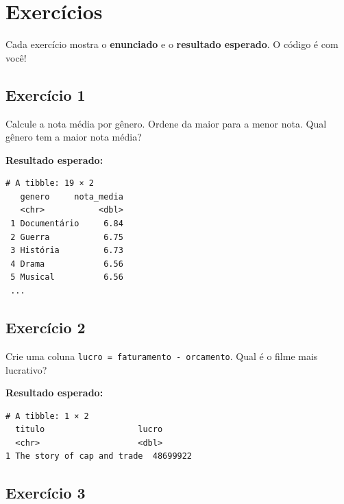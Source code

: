\documentclass[
  letterpaper,
]{scrbook}
\begin{document}
\section{Exercícios}\label{exercuxedcios-1}

\begin{tcolorbox}[enhanced jigsaw, arc=.35mm, bottomrule=.15mm, bottomtitle=1mm, breakable, colback=white, colbacktitle=quarto-callout-note-color!10!white, colframe=quarto-callout-note-color-frame, coltitle=black, left=2mm, leftrule=.75mm, opacityback=0, opacitybacktitle=0.6, rightrule=.15mm, title=\textcolor{quarto-callout-note-color}{\faInfo}\hspace{0.5em}{Como fazer os exercícios}, titlerule=0mm, toprule=.15mm, toptitle=1mm]

Cada exercício mostra o \textbf{enunciado} e o \textbf{resultado
esperado}. O código é com você!

\end{tcolorbox}

\subsection{Exercício 1}\label{exercuxedcio-1-1}

Calcule a nota média por gênero. Ordene da maior para a menor nota. Qual
gênero tem a maior nota média?

\textbf{Resultado esperado:}

\begin{verbatim}
# A tibble: 19 × 2
   genero     nota_media
   <chr>           <dbl>
 1 Documentário     6.84
 2 Guerra           6.75
 3 História         6.73
 4 Drama            6.56
 5 Musical          6.56
 ...
\end{verbatim}

\subsection{Exercício 2}\label{exercuxedcio-2-1}

Crie uma coluna \texttt{lucro\ =\ faturamento\ -\ orcamento}. Qual é o
filme mais lucrativo?

\textbf{Resultado esperado:}

\begin{verbatim}
# A tibble: 1 × 2
  titulo                   lucro
  <chr>                    <dbl>
1 The story of cap and trade  48699922
\end{verbatim}

\subsection{Exercício 3}\label{exercuxedcio-3-1}
\end{document}

